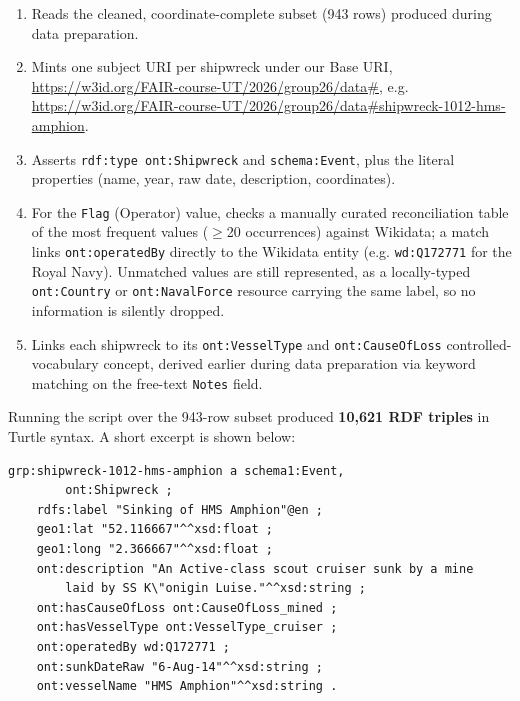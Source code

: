 \begin{enumerate}
    \item Reads the cleaned, coordinate-complete subset (943 rows) produced during data preparation.
    \item Mints one subject URI per shipwreck under our Base URI, \url{https://w3id.org/FAIR-course-UT/2026/group26/data#}, e.g. \url{https://w3id.org/FAIR-course-UT/2026/group26/data#shipwreck-1012-hms-amphion}.
    \item Asserts \texttt{rdf:type ont:Shipwreck} and \texttt{schema:Event}, plus the literal properties (name, year, raw date, description, coordinates).
    \item For the \texttt{Flag} (Operator) value, checks a manually curated reconciliation table of the most frequent values ($\geq$20 occurrences) against Wikidata; a match links \texttt{ont:operatedBy} directly to the Wikidata entity (e.g. \texttt{wd:Q172771} for the Royal Navy). Unmatched values are still represented, as a locally-typed \texttt{ont:Country} or \texttt{ont:NavalForce} resource carrying the same label, so no information is silently dropped.
    \item Links each shipwreck to its \texttt{ont:VesselType} and \texttt{ont:CauseOfLoss} controlled-vocabulary concept, derived earlier during data preparation via keyword matching on the free-text \texttt{Notes} field.
\end{enumerate}

Running the script over the 943-row subset produced \textbf{10,621 RDF triples} in Turtle syntax. A short excerpt is shown below:

\begin{verbatim}
grp:shipwreck-1012-hms-amphion a schema1:Event,
        ont:Shipwreck ;
    rdfs:label "Sinking of HMS Amphion"@en ;
    geo1:lat "52.116667"^^xsd:float ;
    geo1:long "2.366667"^^xsd:float ;
    ont:description "An Active-class scout cruiser sunk by a mine
        laid by SS K\"onigin Luise."^^xsd:string ;
    ont:hasCauseOfLoss ont:CauseOfLoss_mined ;
    ont:hasVesselType ont:VesselType_cruiser ;
    ont:operatedBy wd:Q172771 ;
    ont:sunkDateRaw "6-Aug-14"^^xsd:string ;
    ont:vesselName "HMS Amphion"^^xsd:string .
\end{verbatim}
